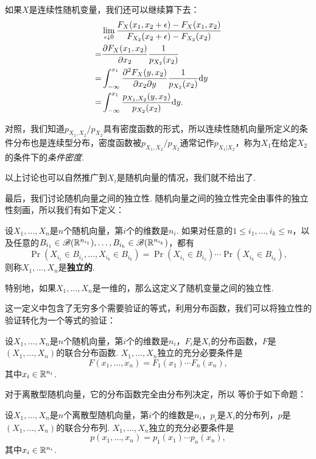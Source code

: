 如果$X$是连续性随机变量，我们还可以继续算下去：
\begin{align*}
    &\lim_{\epsilon\downarrow 0}\frac{F_X(x_1,x_2+\epsilon)-F_X(x_1,x_2)}{F_{X_2}(x_2+\epsilon)-F_{X_2}(x_2)}\\
    =&\frac{\partial F_X(x_1,x_2)}{\partial x_2}\frac{1}{p_{X_2}(x_2)}\\
    =&\int_{-\infty}^{x_1}\frac{\partial^2 F_X(y,x_2)}{\partial x_2\partial y}\frac{1}{p_{X_2}(x_2)}\mathrm{d} y\\
    =&\int_{-\infty}^{x_1}\frac{p_{X_1,X_2}(y,x_2)}{p_{X_2}(x_2)}\mathrm{d} y.
\end{align*}

对照，我们知道$p_{X_1,X_2}/p_{X_2}$具有密度函数的形式，所以连续性随机向量所定义的条件分布也是连续型分布，密度函数被$p_{X_1,X_2}/p_{X_2}$通常记作$p_{X_1|X_2}$，称为$X_1$在给定$X_2$的条件下的\emph{条件密度}. 

以上讨论也可以自然推广到$X_i$是随机向量的情况，我们就不给出了. 

最后，我们讨论随机向量之间的独立性. 随机向量之间的独立性完全由事件的独立性刻画，所以我们有如下定义：

\begin{definition}[随机向量的独立性]
设$X_1,\dots,X_n$是$n$个随机向量，第$i$个的维数是$n_i$. 如果对任意的$1\leq i_1,\dots,i_k\leq n$，以及任意的$B_{i_1}\in\mathscr{B}(\mathbb{R}^{n_{i_1}}),\dots,B_{i_k}\in\mathscr{B}(\mathbb{R}^{n_{i_k}})$，都有
\[\Pr(X_{i_1}\in B_{i_1},\dots,X_{i_k}\in B_{i_k})=\Pr(X_{i_1}\in B_{i_1})\cdots\Pr(X_{i_k}\in B_{i_k}),\]
则称$X_1,\dots,X_n$是\textbf{独立的}. 

特别地，如果$X_1,\dots,X_n$是一维的，那么这定义了随机变量之间的独立性. 
\end{definition}

这一定义中包含了无穷多个需要验证的等式，利用分布函数，我们可以将独立性的验证转化为一个等式的验证：

\begin{theorem}\label{thm:independence}
设$X_1,\dots,X_n$是$n$个随机向量，第$i$个的维数是$n_i$，$F_i$是$X_i$的分布函数，$F$是$(X_1,\dots,X_n)$的联合分布函数. $X_1,\dots,X_n$独立的充分必要条件是
\[F(x_1,\dots,x_n)=F_1(x_1)\cdots F_n(x_n),\]
其中$x_i\in\mathbb{R}^{n_i}$.
\end{theorem}

对于离散型随机向量，它的分布函数完全由分布列决定，所以 等价于如下命题：

\begin{proposition}\label{prop:independence-discrete}
设$X_1,\dots,X_n$是$n$个离散型随机向量，第$i$个的维数是$n_i$，$p_i$是$X_i$的分布列，$p$是$(X_1,\dots,X_n)$的联合分布列. $X_1,\dots,X_n$独立的充分必要条件是
\[p(x_1,\dots,x_n)=p_1(x_1)\cdots p_n(x_n),\]
其中$x_i\in\mathbb{R}^{n_i}$.
\end{proposition}

